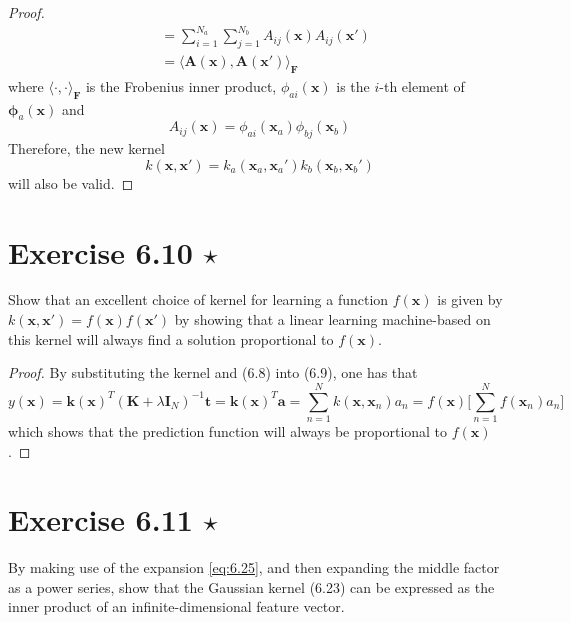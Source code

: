 \begin{proof}
\begin{align*}
        &= \sum_{i=1}^{N_a} \sum_{j=1}^{N_b} A_{ij}(\mathbf{x}) A_{ij}(\mathbf{x}') \\
        &= \langle \mathbf{A}(\mathbf{x}), \mathbf{A}(\mathbf{x}') \rangle_{\bm{F}}
    \end{align*}
    where $\langle \cdot, \cdot \rangle_{\bm{F}}$ is the Frobenius inner product,
    $\phi_{ai}(\mathbf{x})$ is the $i$-th element of $\bm{\phi}_a(\mathbf{x})$ and
    \[
        A_{ij}(\mathbf{x}) = \phi_{ai}(\mathbf{x}_a) \phi_{bj}(\mathbf{x}_b)
    \] 
    Therefore, the new kernel
    \begin{equation*}
        k(\mathbf{x}, \mathbf{x}') = 
        k_a(\mathbf{x}_a, \mathbf{x}_a') k_b(\mathbf{x}_b, \mathbf{x}_b')
        \tag{6.22}\label{eq:6.22}
    \end{equation*}
    will also be valid.
\end{proof}

\section*{Exercise 6.10 $\star$}
Show that an excellent choice of kernel for learning a function
$f(\mathbf{x})$ is given by $k(\mathbf{x}, \mathbf{x}') = f(\mathbf{x})f(\mathbf{x}')$
by showing that a linear learning machine-based on this kernel will always find a solution
proportional to $f(\mathbf{x})$.

\vspace{1em}

\begin{proof}
    By substituting the kernel and (6.8) into (6.9), one has that
    \[
        y(\mathbf{x}) 
        = \mathbf{k}(\mathbf{x})^T(\mathbf{K} + \lambda \mathbf{I}_N)^{-1} \mathbf{t}
        = \mathbf{k}(\mathbf{x})^T \mathbf{a}
        = \sum_{n=1}^{N} k(\mathbf{x}, \mathbf{x}_n) a_n
        = f(\mathbf{x}) \bigg[\sum_{n=1}^{N} f(\mathbf{x}_n) a_n\bigg]
    \] 
    which shows that the prediction function will always be proportional
    to $f(\mathbf{x})$.
\end{proof}

\section*{Exercise 6.11 $\star$}
By making use of the expansion \eqref{eq:6.25}, and then expanding
the middle factor as a power series, show that the Gaussian kernel
(6.23) can be expressed as the inner product
of an infinite-dimensional feature vector.

